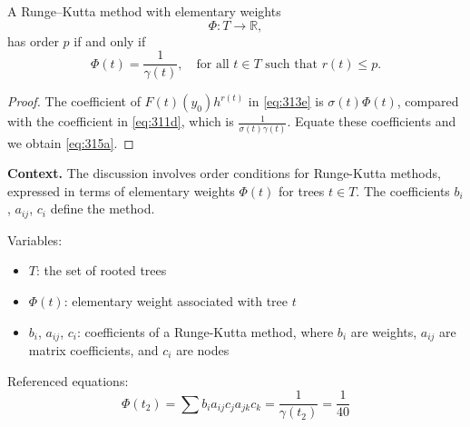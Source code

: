 \begin{theorem}

  \label{thm:315A}
A Runge--Kutta method with elementary weights
\[
\Phi : T \to \mathbb{R},
\]
has order $p$ if and only if
\[
\Phi(t) = \frac{1}{\gamma(t)}, \quad \text{for all } t \in T \text{ such that } r(t) \leq p. \tag{315a}
\]
\end{theorem}

\begin{proof}
The coefficient of $F(t)(y_0)h^{r(t)}$ in \eqref{eq:313e} is $\sigma(t) \Phi(t)$, compared with the coefficient in \eqref{eq:311d}, which is $\frac{1}{\sigma(t)\gamma(t)}$. Equate these coefficients and we obtain \eqref{eq:315a}.
\end{proof}

\noindent\textbf{Context.}
The discussion involves order conditions for Runge-Kutta methods, expressed in terms of elementary weights $\Phi(t)$ for trees $t \in T$. The coefficients $b_i$, $a_{ij}$, $c_i$ define the method.

Variables:
\begin{itemize}
    \item $T$: the set of rooted trees
    \item $\Phi(t)$: elementary weight associated with tree $t$
    \item $b_i$, $a_{ij}$, $c_i$: coefficients of a Runge-Kutta method, where $b_i$ are weights, $a_{ij}$ are matrix coefficients, and $c_i$ are nodes
\end{itemize}

Referenced equations:
\begin{equation}
    \Phi(t_2) = \sum b_i a_{ij} c_j a_{jk} c_k = \frac{1}{\gamma(t_2)} = \frac{1}{40}
    \tag{316b}
\end{equation}

